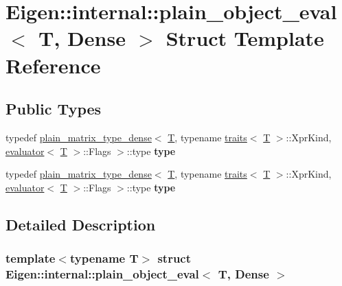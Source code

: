 \hypertarget{struct_eigen_1_1internal_1_1plain__object__eval_3_01_t_00_01_dense_01_4}{}\section{Eigen\+:\+:internal\+:\+:plain\+\_\+object\+\_\+eval$<$ T, Dense $>$ Struct Template Reference}
\label{struct_eigen_1_1internal_1_1plain__object__eval_3_01_t_00_01_dense_01_4}
\subsection*{Public Types}
\begin{DoxyCompactItemize}
\item 
\mbox{\label{struct_eigen_1_1internal_1_1plain__object__eval_3_01_t_00_01_dense_01_4_afac3e6affd89029108afafdc3e00f62d}} 
typedef \hyperlink{struct_eigen_1_1internal_1_1plain__matrix__type__dense}{plain\+\_\+matrix\+\_\+type\+\_\+dense}$<$ \hyperlink{group___sparse_core___module}{T}, typename \hyperlink{struct_eigen_1_1internal_1_1traits}{traits}$<$ \hyperlink{group___sparse_core___module}{T} $>$\+::Xpr\+Kind, \hyperlink{struct_eigen_1_1internal_1_1evaluator}{evaluator}$<$ \hyperlink{group___sparse_core___module}{T} $>$\+::Flags $>$\+::type {\bfseries type}
\item 
\mbox{\label{struct_eigen_1_1internal_1_1plain__object__eval_3_01_t_00_01_dense_01_4_afac3e6affd89029108afafdc3e00f62d}} 
typedef \hyperlink{struct_eigen_1_1internal_1_1plain__matrix__type__dense}{plain\+\_\+matrix\+\_\+type\+\_\+dense}$<$ \hyperlink{group___sparse_core___module}{T}, typename \hyperlink{struct_eigen_1_1internal_1_1traits}{traits}$<$ \hyperlink{group___sparse_core___module}{T} $>$\+::Xpr\+Kind, \hyperlink{struct_eigen_1_1internal_1_1evaluator}{evaluator}$<$ \hyperlink{group___sparse_core___module}{T} $>$\+::Flags $>$\+::type {\bfseries type}
\end{DoxyCompactItemize}


\subsection{Detailed Description}
\subsubsection*{template$<$typename T$>$\newline
struct Eigen\+::internal\+::plain\+\_\+object\+\_\+eval$<$ T, Dense $>$}



